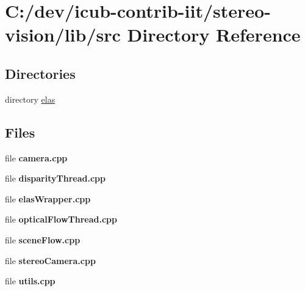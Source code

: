 \section{C\+:/dev/icub-\/contrib-\/iit/stereo-\/vision/lib/src Directory Reference}
\label{dir_a065c5f60305fee3569f887679366939}
\subsection*{Directories}
\begin{DoxyCompactItemize}
\item 
directory \hyperlink{dir_f39c8903d404d794e705ad03c67ee29e}{elas}
\end{DoxyCompactItemize}
\subsection*{Files}
\begin{DoxyCompactItemize}
\item 
file {\bfseries camera.\+cpp}
\item 
file {\bfseries disparity\+Thread.\+cpp}
\item 
file {\bfseries elas\+Wrapper.\+cpp}
\item 
file {\bfseries optical\+Flow\+Thread.\+cpp}
\item 
file {\bfseries scene\+Flow.\+cpp}
\item 
file {\bfseries stereo\+Camera.\+cpp}
\item 
file {\bfseries utils.\+cpp}
\end{DoxyCompactItemize}
